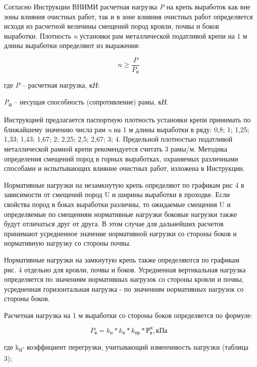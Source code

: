 \begin{multicols}{2}
Согласно Инструкции ВНИМИ расчетная нагрузка \emph{P} на крепь выработок
как вне зоны влияния очистных работ, так и в зоне влияния очистных работ
определяется исходя из расчетной величины смещений пород кровли, почвы и
боков выработки. Плотность \emph{n} установки рам металлической
податливой крепи на 1 м длины выработки определяют из выражения:

\begin{equation}
n \geq \frac{P}{P_{\text{н}}}
\end{equation}

где \emph{P} -- расчетная нагрузка, к\emph{Н}:

\emph{P}\textsubscript{н} -- несущая способность (сопротивление) рамы,
к\emph{Н}.

Инструкцией предлагается паспортную плотность установки крепи принимать
по ближайшему значению числа рам \emph{n} на 1 м длины выработки в ряду:
0,8; 1; 1,25; 1,33; 1,43; 1,67; 2; 2,25; 2,5; 2,67; 3; 4. Предельной
плотностью податливой металлической рамной крепи рекомендуется считать 3
рамы/м. Методика определения смещений пород в горных выработках,
охраняемых различными способами и испытывающих влияние очистных работ,
изложена в Инструкции.

Нормативные нагрузки на незамкнутую крепь определяют по графикам рис 4 в
зависимости от смещений пород U и ширины выработки в проходке. Если
свойства пород в боках выработки различны, то ожидаемые смещения U и
определяемые по смещениям нормативные нагрузки боковые нагрузки также
будут отличаться друг от друга. В этом случае для дальнейших расчетов
принимают усредненное значение нормативной нагрузки со стороны боков и
нормативную нагрузку со стороны почвы.

Нормативные нагрузки на замкнутую крепь также определяются по графикам
рис. 4 отдельно для кровли, почвы и боков. Усредненная вертикальная
нагрузка определяется по значениям нормативных нагрузок со стороны
кровли и почвы, усредненная горизонтальная нагрузка - по значениям
нормативных нагрузок со стороны боков.

Расчетная нагрузка на 1 м выработки со стороны боков определяется по
формуле:

\begin{equation}
P_{\text{в}}=k_{\text{п}}  * k_{\text{н}}  * k_{\text{пр}}  * Р_{\text{в}}^{\text{н}}, \text{кПа}
\end{equation}

где k\textsubscript{п}- коэффициент перегрузки, учитывающий изменчивость
нагрузки (таблица 3);


\end{multicols}
